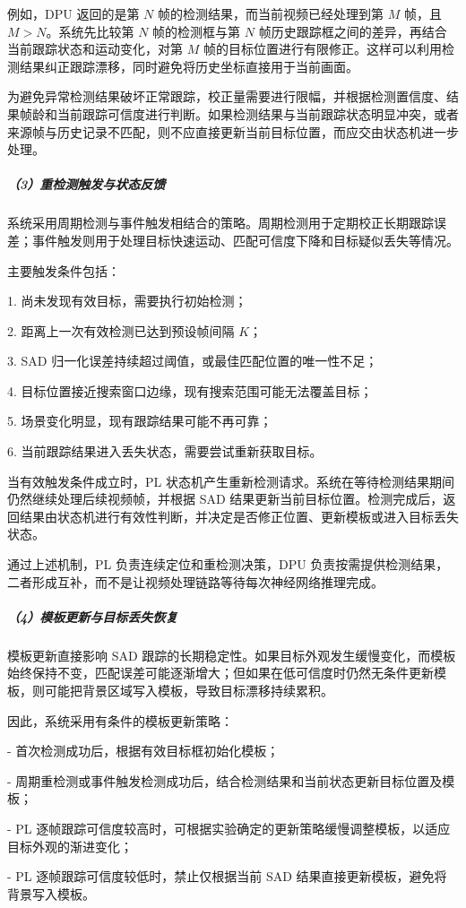 \documentclass[UTF8,a4paper,12pt,fontset=windows]{ctexart}
\begin{document}
例如，DPU 返回的是第 \(N\) 帧的检测结果，而当前视频已经处理到第 \(M\) 帧，且 \(M>N\)。系统先比较第 \(N\) 帧的检测框与第 \(N\) 帧历史跟踪框之间的差异，再结合当前跟踪状态和运动变化，对第 \(M\) 帧的目标位置进行有限修正。这样可以利用检测结果纠正跟踪漂移，同时避免将历史坐标直接用于当前画面。

为避免异常检测结果破坏正常跟踪，校正量需要进行限幅，并根据检测置信度、结果帧龄和当前跟踪可信度进行判断。如果检测结果与当前跟踪状态明显冲突，或者来源帧与历史记录不匹配，则不应直接更新当前目标位置，而应交由状态机进一步处理。

\subparagraph*{（3）重检测触发与状态反馈}
系统采用周期检测与事件触发相结合的策略。周期检测用于定期校正长期跟踪误差；事件触发则用于处理目标快速运动、匹配可信度下降和目标疑似丢失等情况。

主要触发条件包括：

1. 尚未发现有效目标，需要执行初始检测；

2. 距离上一次有效检测已达到预设帧间隔 \(K\)；

3. SAD 归一化误差持续超过阈值，或最佳匹配位置的唯一性不足；

4. 目标位置接近搜索窗口边缘，现有搜索范围可能无法覆盖目标；

5. 场景变化明显，现有跟踪结果可能不再可靠；

6. 当前跟踪结果进入丢失状态，需要尝试重新获取目标。

当有效触发条件成立时，PL 状态机产生重新检测请求。系统在等待检测结果期间仍然继续处理后续视频帧，并根据 SAD 结果更新当前目标位置。检测完成后，返回结果由状态机进行有效性判断，并决定是否修正位置、更新模板或进入目标丢失状态。

通过上述机制，PL 负责连续定位和重检测决策，DPU 负责按需提供检测结果，二者形成互补，而不是让视频处理链路等待每次神经网络推理完成。

\subparagraph*{（4）模板更新与目标丢失恢复}
模板更新直接影响 SAD 跟踪的长期稳定性。如果目标外观发生缓慢变化，而模板始终保持不变，匹配误差可能逐渐增大；但如果在低可信度时仍然无条件更新模板，则可能把背景区域写入模板，导致目标漂移持续累积。

因此，系统采用有条件的模板更新策略：

- 首次检测成功后，根据有效目标框初始化模板；

- 周期重检测或事件触发检测成功后，结合检测结果和当前状态更新目标位置及模板；

- PL 逐帧跟踪可信度较高时，可根据实验确定的更新策略缓慢调整模板，以适应目标外观的渐进变化；

- PL 逐帧跟踪可信度较低时，禁止仅根据当前 SAD 结果直接更新模板，避免将背景写入模板。
\end{document}
